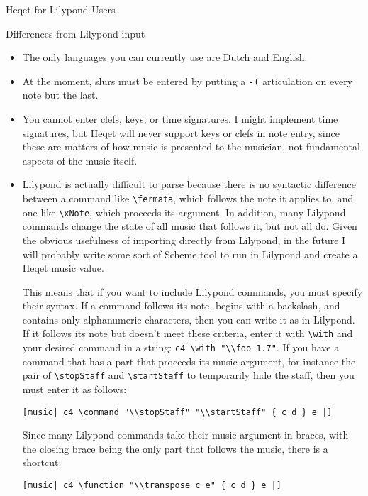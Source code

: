 \documentclass{article}
\begin{document}
\begin{section}{Heqet for Lilypond Users}
\begin{subsection}{Differences from Lilypond input}
\begin{itemize}
\item The only languages you can currently use are Dutch and English. 

\item At the moment, slurs must be entered by putting a \verb+-(+ articulation on every note but the last.

\item You cannot enter clefs, keys, or time signatures. I might implement time signatures, but Heqet will never support keys or clefs in note entry, since these are matters of how music is presented to the musician, not fundamental aspects of the music itself.

\item Lilypond is actually difficult to parse because there is no syntactic difference between a command like \verb+\fermata+, which follows the note it applies to, and one like \verb+\xNote+, which proceeds its argument. In addition, many Lilypond commands change the state of all music that follows it, but not all do. Given the obvious usefulness of importing directly from Lilypond, in the future I will probably write some sort of Scheme tool to run in Lilypond and create a Heqet music value. 

This means that if you want to include Lilypond commands, you must specify their syntax. If a command follows its note, begins with a backslash, and contains only alphanumeric characters, then you can write it as in Lilypond. If it follows its note but doesn't meet these criteria, enter it with \verb+\with+ and your desired command in a string: \verb+c4 \with "\\foo 1.7"+. If you have a command that has a part that proceeds its music argument, for instance the pair of \verb+\stopStaff+ and \verb+\startStaff+ to temporarily hide the staff, then you must enter it as follows:

\begin{verbatim}
[music| c4 \command "\\stopStaff" "\\startStaff" { c d } e |]
\end{verbatim}

Since many Lilypond commands take their music argument in braces, with the closing brace being the only part that follows the music, there is a shortcut:

\begin{verbatim}
[music| c4 \function "\\transpose c e" { c d } e |]
\end{verbatim}


\end{itemize}
\end{subsection}
\end{section}
\end{document}
